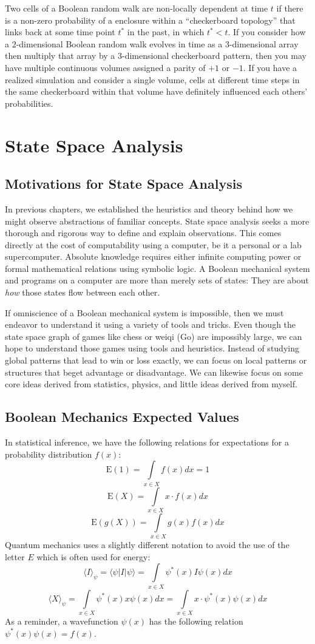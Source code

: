 \documentclass[10pt, a5paper, twoside, openright]{memoir}
\begin{document}
Two cells of a Boolean random walk are non-locally dependent at time $t$ if there is a non-zero probability of a enclosure within a ``checkerboard topology'' that links back at some time point $t^*$ in the past, in which $t^* < t$. If you consider how a $2$-dimensional Boolean random walk evolves in time as a $3$-dimensional array then multiply that array by a $3$-dimensional checkerboard pattern, then you may have multiple continuous volumes assigned a parity of $+1$ or $-1$. If you have a realized simulation and consider a single volume, cells at different time steps in the same checkerboard within that volume have definitely influenced each others' probabilities.

\chapter{State Space Analysis}
\section{Motivations for State Space Analysis}
In previous chapters, we established the heuristics and theory behind how we might observe abstractions of familiar concepts. State space analysis seeks a more thorough and rigorous way to define and explain observations. This comes directly at the cost of computability using a computer, be it a personal or a lab supercomputer. Absolute knowledge requires either infinite computing power or formal mathematical relations using symbolic logic. A Boolean mechanical system and programs on a computer are more than merely sets of states: They are about \textit{how} those states flow between each other.

If omniscience of a Boolean mechanical system is impossible, then we must endeavor to understand it using a variety of tools and tricks. Even though the state space graph of games like chess or weiqi (Go) are impossibly large, we can hope to understand those games using tools and heuristics. Instead of studying global patterns that lead to win or loss exactly, we can focus on local patterns or structures that beget advantage or disadvantage. We can likewise focus on some core ideas derived from statistics, physics, and little ideas derived from myself.


\section{Boolean Mechanics Expected Values}
In statistical inference, we have the following relations for expectations for a probability distribution $f(x)$:
$$\mathrm{E}(1) = \int\limits_{x \in X} f(x)dx = 1$$
$$\mathrm{E}(X) = \int\limits_{x \in X} x \cdot f(x)dx$$
$$\mathrm{E}(g(X)) = \int\limits_{x \in X} g(x) f(x)dx$$
Quantum mechanics uses a slightly different notation to avoid the use of the letter $E$ which is often used for energy:
$$\langle I \rangle_\psi = \langle \psi | I | \psi \rangle = \int\limits_{x \in X} \psi^{*}(x) I \psi(x)dx$$
$$\langle X \rangle_\psi = \int\limits_{x \in X} \psi^{*}(x) x \psi(x)dx = \int\limits_{x \in X} x \cdot \psi^{*}(x) \psi(x)dx$$
As a reminder, a wavefunction $\psi(x)$ has the following relation $\psi^*(x) \psi(x) = f(x)$. 
\end{document}
